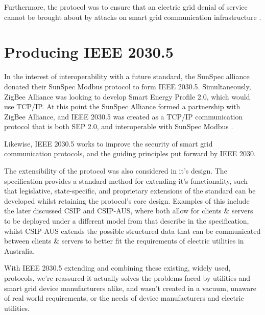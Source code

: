 Furthermore, the protocol was to ensure that an electric grid denial of service cannot be brought about by attacks on smart grid communication infrastructure \cite{2030Security} \cite[]{2030}. 


\section{Producing IEEE 2030.5}

In the interest of interoperability with a future standard, the SunSpec alliance donated their SunSpec Modbus protocol to form IEEE 2030.5. Simultaneously, ZigBee Alliance was looking to develop Smart Energy Profile 2.0, which would use TCP/IP.
At this point the SunSpec Alliance formed a partnership with ZigBee Alliance, and IEEE 2030.5 was created as a TCP/IP communication protocol that is both SEP 2.0, and interoperable with SunSpec Modbus \cite[]{SunspecModbusArticle}. 

Likewise, IEEE 2030.5 works to improve the security of smart grid communication protocols, and the guiding principles put forward by IEEE 2030. 

The extensibility of the protocol was also considered in it's design. The specification provides a standard method for extending it's functionality, such that legislative, state-specific, and proprietary extensions of the standard can be developed whilst retaining the protocol's core design. Examples of this include the later discussed CSIP and CSIP-AUS, where both allow for clients \& servers to be deployed under a different model from that describe  in the specification, whilst CSIP-AUS extends the possible structured data that can be communicated between clients \& servers to better fit the requirements of electric utilities in Australia.

With IEEE 2030.5 extending and combining these existing, widely used, protocols, we're reassured it actually solves the problems faced by utilities and smart grid device manufacturers alike, and wasn't created in a vacuum, unaware of real world requirements, or the needs of device manufacturers and electric utilities.


